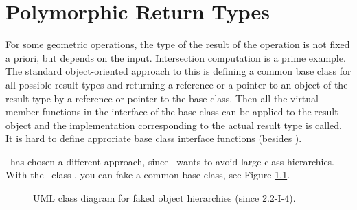 
\chapter{Polymorphic Return Types}
%

For some geometric operations, the type of the result of the operation
is not fixed a priori, but depends on the input. Intersection computation
is a prime example. The standard object-oriented approach to this is defining
a common base class for all possible result types and returning a reference 
or a pointer to an object of the result type by a reference or pointer to the
base class. Then all the virtual member functions in the interface of 
the base class can be applied to the result object and the implementation
corresponding to the actual result type is called. It is hard to define
approriate base class interface functions (besides ).

\cgal\ has chosen a different approach, since \cgal\ wants to avoid large
class hierarchies. With the \cgal\ 
class , you can fake a common
base class\ccIndexSubitem{base class}{faking}, see Figure \ref{Fig:Object}. 

\begin{figure}[h]
\caption{UML class diagram for faked object hierarchies (since 2.2-I-4).\label{Fig:Object}}
\end{figure}

